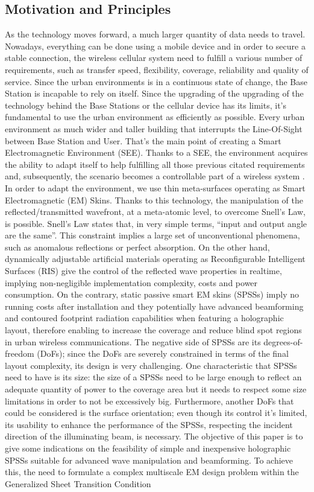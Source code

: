 \subsection{Motivation and Principles}
As the technology moves forward, a much larger quantity of data needs to travel. Nowadays, everything can be done using a mobile device and in order to secure a stable connection, the wireless cellular system need to fulfill a various number of requirements, such as transfer speed, flexibility, coverage, reliability and quality of service. Since the urban environments is in a continuous state of change, the Base Station is incapable to rely on itself. Since the upgrading of the upgrading of the technology behind the Base Stations or the cellular device has its limits, it's fundamental to use the urban environment as efficiently as possible. Every urban environment as much wider and taller building that interrupts the Line-Of-Sight between Base Station and User. That's the main point of creating a Smart Electromagnetic Environment (SEE). Thanks to a SEE, the environment acquires the ability to adapt itself to help fulfilling all those previous citated requirements and, subsequently, the scenario becomes a controllable part of a wireless system . In order to adapt the environment, we use thin meta-surfaces operating as Smart Electromagnetic (EM) Skins. Thanks to this technology, the manipulation of the reflected/transmitted wavefront, at a meta-atomic level, to overcome Snell's Law, is possible. Snell's Law states that, in very simple terms, “input and output angle are the same”. This constraint implies a large set of unconventional phenomena, such as anomalous reflections or perfect absorption. On the other hand, dynamically adjustable artificial materials operating as Reconfigurable Intelligent Surfaces (RIS) give the control of the reflected wave properties in realtime, implying non-negligible implementation complexity, costs and power consumption. On the contrary, static passive smart EM skins (SPSSs) imply no running costs after installation and they potentially have advanced beamforming and contoured footprint radiation capabilities when featuring a holographic layout, therefore enabling to increase the coverage and reduce blind spot regions in urban wireless communications. The negative side of SPSSs are its degrees-of-freedom (DoFs); since the DoFs are severely constrained in terms of the final layout complexity, its design is very challenging. One characteristic that SPSSs need to have is its size: the size of a SPSSs need to be large enough to reflect an adequate quantity of power to the coverage area but it needs to respect some size limitations in order to not be excessively big. Furthermore, another DoFs that could be considered is the surface orientation; even though its control it’s limited, its usability to enhance the performance of the SPSSs,  respecting the incident direction of the illuminating beam, is necessary. The objective of this paper is to give some indications on the feasibility of simple and inexpensive holographic SPSSs suitable for advanced wave manipulation and beamforming. To achieve this, the need to formulate a complex multiscale EM design problem within the Generalized Sheet Transition Condition 